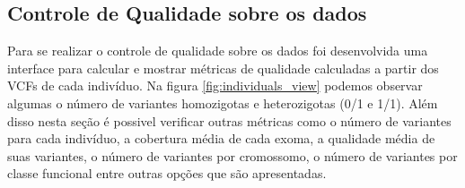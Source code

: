 
\subsection{Controle de Qualidade sobre os dados}

Para se realizar o controle de qualidade sobre os dados foi desenvolvida uma interface para calcular e mostrar métricas de qualidade calculadas a partir dos VCFs de cada indivíduo. Na figura \ref{fig:individuals_view} podemos observar algumas o número de variantes homozigotas e heterozigotas (0/1 e 1/1). Além disso nesta seção é possivel verificar outras métricas como o número de variantes para cada indivíduo, a cobertura média de cada exoma, a qualidade média de suas variantes, o número de variantes por cromossomo, o número de variantes por classe funcional entre outras opções que são apresentadas.

